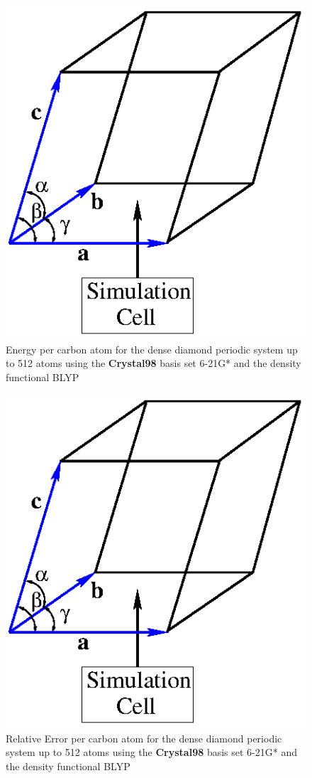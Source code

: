 \documentclass[prb,aps,nobibnotes,twocolumn,doublespace,twocolumngrid,superbib]{revtex4}
\begin{document}
\begin{figure}

\caption{\label{figure:EnergyPerN} Energy per carbon atom for the dense diamond
periodic system up to 512 atoms using the {\bf Crystal98} basis set 6-21G* \cite{C98Basis} and the 
density functional BLYP \cite{Becke93}}

{\centering \includegraphics{UnitCell_2.ps} \par} 
\end{figure}
%
%
%
\begin{figure}

\caption{\label{figure:ErrorPerN} Relative Error per carbon atom for the dense diamond
periodic system up to 512 atoms using the {\bf Crystal98} basis set 6-21G* \cite{C98Basis} and the 
density functional BLYP \cite{Becke93}}

{\centering \includegraphics{UnitCell_2.ps} \par} 
\end{figure}
\end{document}
